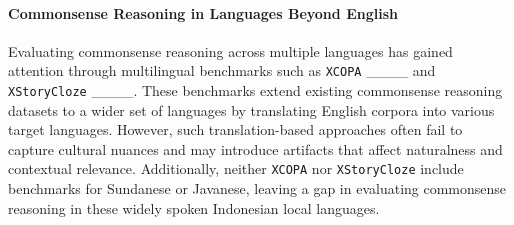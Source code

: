 \paragraph{Commonsense Reasoning in Languages Beyond English}

Evaluating commonsense reasoning across multiple languages has gained attention through multilingual benchmarks such as \texttt{XCOPA} ____ and \texttt{XStoryCloze} ____. These benchmarks extend existing commonsense reasoning datasets to a wider set of languages by translating English corpora into various target languages. However, such translation-based approaches often fail to capture cultural nuances and may introduce artifacts that affect naturalness and contextual relevance. Additionally, neither \texttt{XCOPA} nor \texttt{XStoryCloze} include benchmarks for Sundanese or Javanese, leaving a gap in evaluating commonsense reasoning in these widely spoken Indonesian local languages.




